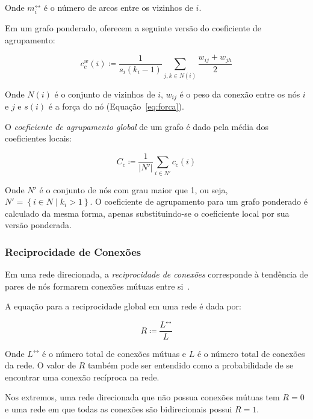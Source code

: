 \documentclass[12pt,a4paper,final]{article}
\newcommand{\defn}{\coloneqq} %
\newcommand{\linkboth}[1]{#1^\leftrightarrow} %
\newcommand{\weighted}[1]{#1^w} %
\begin{document}
Onde $\linkboth{m}_i$ é o número de arcos entre os vizinhos de $i$.

Em um grafo ponderado,  oferecem a seguinte versão do coeficiente de agrupamento:

\begin{equation}
\weighted{c}_c(i) \defn \frac{1}{s_i(k_i - 1)} \sum_{j,k \in N(i)} \frac{w_{ij} + w_{jh}}{2}
\end{equation}

Onde $N(i)$ é o conjunto de vizinhos de $i$, $w_{ij}$ é o peso da conexão entre os nós $i$ e $j$ e $s(i)$ é a força do nó (Equação~\ref{eq:forca}).

O \textit{coeficiente de agrupamento global} de um grafo é dado pela média dos coeficientes locais:

\begin{equation}
C_c \defn \frac{1}{|N'|} \sum_{i \in N'} c_c(i)
\end{equation}

Onde $N'$ é o conjunto de nós com grau maior que 1, ou seja, $N' = \left\lbrace i \in N \mid k_i > 1 \right\rbrace$. O coeficiente de agrupamento para um grafo ponderado é calculado da mesma forma, apenas substituindo-se o coeficiente local por sua versão ponderada.

\subsubsection{Reciprocidade de Conexões} \label{sec:reciprocidade}

Em uma rede direcionada, a \textit{reciprocidade de conexões} corresponde à tendência de pares de nós formarem conexões mútuas entre si~\cite{Garlaschelli2004-db}.

A equação para a reciprocidade global em uma rede é dada por:

\begin{equation} \label{eq:reciprocidade}
R \defn \frac{\linkboth{L}}{L}
\end{equation}

Onde $\linkboth{L}$ é o número total de conexões mútuas e $L$ é o número total de conexões da rede. O valor de $R$ também pode ser entendido como a probabilidade de se encontrar uma conexão recíproca na rede.

Nos extremos, uma rede direcionada que não possua conexões mútuas tem $R = 0$ e uma rede em que todas as conexões são bidirecionais possui $R = 1$.
\end{document}
